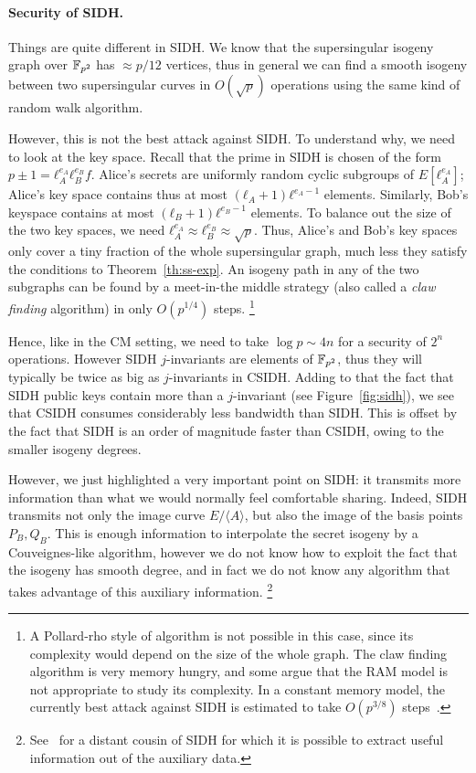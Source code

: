 \documentclass[b5layout]{hdr}
\begin{document}
\paragraph{Security of SIDH.}
Things are quite different in SIDH. %
We know that the supersingular isogeny graph over $\mathbb{F}_{p^2}$ has
$≈p/12$ vertices, thus in general we can find a smooth isogeny between
two supersingular curves in $O(\sqrt{p})$ operations using the same
kind of random walk algorithm. %

However, this is not the best attack against SIDH. %
To understand why, we need to look at the key space. %
Recall that the prime in SIDH is chosen of the form
$p±1=ℓ_A^{e_A}ℓ_B^{e_B}f$. %
Alice's secrets are uniformly random cyclic subgroups of
$E[ℓ_A^{e_A}]$; Alice's key space contains thus at most
$(ℓ_A+1)ℓ^{e_A-1}$ elements. %
Similarly, Bob's keyspace contains at most $(ℓ_B+1)ℓ^{e_B-1}$
elements. %
To balance out the size of the two key spaces, we need
$ℓ_A^{e_A}≈ℓ_B^{e_B}≈\sqrt{p}$. %
Thus, Alice's and Bob's key spaces only cover a tiny fraction of the
whole supersingular graph, much less they satisfy the conditions to
Theorem~\ref{th:ss-exp}. %
An isogeny path in any of the two subgraphs can be found by a
meet-in-the middle strategy (also called a \emph{claw finding}
algorithm) in only $O(p^{1/4})$ steps.%
\footnote{A Pollard-rho style of algorithm is not possible in this
  case, since its complexity would depend on the size of the whole
  graph. %
  The claw finding algorithm is very memory hungry, and some argue
  that the RAM model is not appropriate to study its complexity. %
  In a constant memory model, the currently best attack against SIDH
  is estimated to take $O(p^{3/8})$
  steps~\cite{cryptoeprint:2018:313}.} %

Hence, like in the CM setting, we need to take $\log p\sim 4n$ for a
security of $2^n$ operations. %
However SIDH $j$-invariants are elements of $\mathbb{F}_{p^2}$, thus they will
typically be twice as big as $j$-invariants in CSIDH. %
Adding to that the fact that SIDH public keys contain more than a
$j$-invariant (see Figure~\ref{fig:sidh}), we see that CSIDH consumes
considerably less bandwidth than SIDH. %
This is offset by the fact that SIDH is an order of magnitude faster
than CSIDH, owing to the smaller isogeny degrees. %

However, we just highlighted a very important point on SIDH: it
transmits more information than what we would normally feel
comfortable sharing. %
Indeed, SIDH transmits not only the image curve $E/〈A〉$, but also
the image of the basis points $P_B,Q_B$. %
This is enough information to interpolate the secret isogeny by a
Couveignes-like algorithm, however we do not know how to exploit the
fact that the isogeny has smooth degree, and in fact we do not know
any algorithm that takes advantage of this auxiliary information.%
\footnote{See~\cite{10.1007/978-3-319-70697-9_12} for a distant cousin
  of SIDH for which it is possible to extract useful information out
  of the auxiliary data.} %
\end{document}
